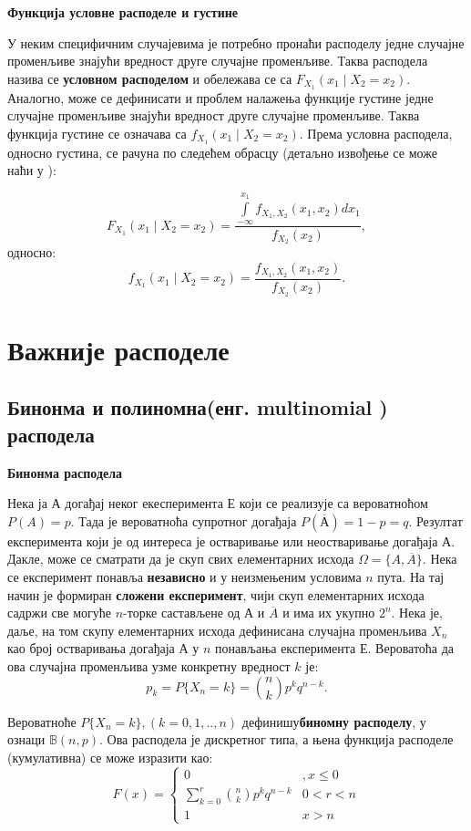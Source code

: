 \textbf{Функција условне расподеле и густине}


У неким специфичним случајевима је потребно пронаћи расподелу једне случајне променљиве знајући вредност друге случајне променљиве. Таква расподела назива се \textbf{условном расподелом} и обележава се са $F_{X_1}(x_1 \mid X_2 = x_2)$. Аналогно, може се дефинисати и проблем налажења функције густине једне случајне променљиве знајући вредност друге случајне променљиве. Таква функција густине се означава са $f_{X_1}(x_1 \mid X_2 = x_2 )$. Према \cite{verov4} условна расподела, односно густина, се рачуна по следећем обрасцу (детаљно извођење се може наћи у \cite{verov4}):

$$  F_{X_1}(x_1 \mid X_2 = x_2) = \frac{\int \limits_{-\infty}^{x_1} f_{X_1,X_2}(x_1,x_2)dx_1}{f_{X_2}(x_2)}, $$
односно:
$$  f_{X_1}(x_1 \mid X_2 = x_2) = \frac{f_{X_1,X_2}(x_1,x_2)}{f_{X_2}(x_2)}. $$




\section{Важније расподеле}
\subsection{Бинонма и полиномна(енг. multinomial ) расподела}

\textbf{Бинонма расподела}

Нека ја $А$ догађај неког екесперимента $Е$ који се реализује са вероватноћом  $P(A) = p$. Тада је вероватноћа супротног догађаја $P(\overline{А}) = 1-p = q$. 
Резултат експеримента који је од интереса је остваривање или неостваривање догађаја $А$. Дакле, може се сматрати да је скуп свих елементарних исхода $\Omega = \lbrace A, \overline{A} \rbrace$. Нека се експеримент понавља \textbf{независно} и у неизмењеним условима $n$ пута. На тај начин је формиран \textbf{сложени експеримент}, чији  скуп елементарних исхода садржи све могуће $n$-торке састављене од $А$ и $\overline{A}$ и има их укупно $2^n$. Нека је, даље, на том скупу елементарних исхода дефинисана случајна променљива $X_n$ као  број остваривања догађаја $А$ у $n$ понављања експеримента $Е$. Вероватоћа да ова случајна променљива узме конкретну вредност $k$ је:
$$
p_k = P \lbrace X_n = k \rbrace ={ n \choose k} p^kq^{n-k}.
$$

Вероватноће $P \lbrace X_n = k \rbrace ,(k=0,1,..,n)$ дефинишу\textbf{биномну расподелу}, у ознаци $\mathbb{B}(n,p)$. Ова расподела је дискретног типа, а њена функција расподеле (кумулативна) се може изразити као:
$$
F(x)=\left\lbrace
\begin{array}{cc}
0 & , x \leq 0 \\
\sum_{k=0}^{r} {n \choose k} p^kq^{n-k} & 0 < r < n \\
1 & x > n
\end{array}
\right.
$$

